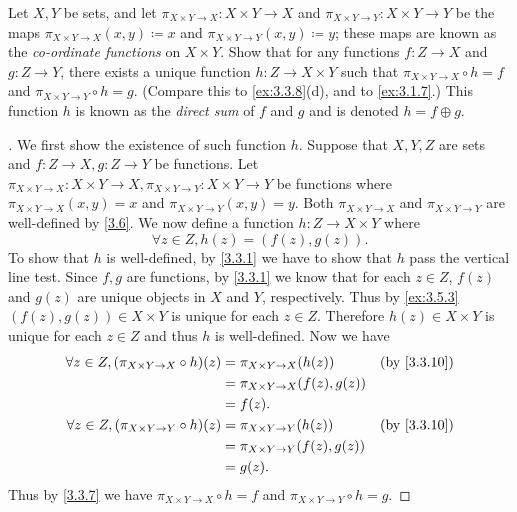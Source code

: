 \begin{ex}\label{ex:3.5.7}
	Let \(X, Y\) be sets, and let \(\pi_{X \times Y \to X} : X \times Y \to X\) and \(\pi_{X \times Y \to Y} : X \times Y \to Y\) be the maps \(\pi_{X \times Y \to X}(x, y) \coloneqq x\) and \(\pi_{X \times Y \to Y}(x, y) \coloneqq y\);
	these maps are known as the \emph{co-ordinate functions} on \(X \times Y\).
	Show that for any functions \(f : Z \to X\) and \(g : Z \to Y\), there exists a unique function \(h : Z \to X \times Y\) such that \(\pi_{X \times Y \to X} \circ h = f\) and \(\pi_{X \times Y \to Y} \circ h = g\).
	(Compare this to \cref{ex:3.3.8}(d), and to \cref{ex:3.1.7}.)
	This function \(h\) is known as the \emph{direct sum} of \(f\) and \(g\) and is denoted \(h = f \oplus g\).
\end{ex}

\begin{proof}[]
	We first show the existence of such function \(h\).
	Suppose that \(X, Y, Z\) are sets and \(f : Z \to X, g : Z \to Y\) be functions.
	Let \(\pi_{X \times Y \to X} : X \times Y \to X, \pi_{X \times Y \to Y} : X \times Y \to Y\) be functions where \(\pi_{X \times Y \to X}(x, y) = x\) and \(\pi_{X \times Y \to Y}(x, y) = y\).
	Both \(\pi_{X \times Y \to X}\) and \(\pi_{X \times Y \to Y}\) are well-defined by \cref{3.6}.
	We now define a function \(h : Z \to X \times Y\) where
	\[
		\forall z \in Z, h(z) = (f(z), g(z)).
	\]
	To show that \(h\) is well-defined, by \cref{3.3.1} we have to show that \(h\) pass the vertical line test.
	Since \(f, g\) are functions, by \cref{3.3.1} we know that for each \(z \in Z\), \(f(z)\) and \(g(z)\) are unique objects in \(X\) and \(Y\), respectively.
	Thus by \cref{ex:3.5.3} \((f(z), g(z)) \in X \times Y\) is unique for each \(z \in Z\).
	Therefore \(h(z) \in X \times Y\) is unique for each \(z \in Z\) and thus \(h\) is well-defined.
	Now we have
	\begin{align*}
		\forall z \in Z, (\pi_{X \times Y \to X} \circ h)(z) & = \pi_{X \times Y \to X}(h(z))       &  & \by{3.3.10} \\
		                                                     & = \pi_{X \times Y \to X}(f(z), g(z))                  \\
		                                                     & = f(z).                                               \\
		\forall z \in Z, (\pi_{X \times Y \to Y} \circ h)(z) & = \pi_{X \times Y \to Y}(h(z))       &  & \by{3.3.10} \\
		                                                     & = \pi_{X \times Y \to Y}(f(z), g(z))                  \\
		                                                     & = g(z).
	\end{align*}
	Thus by \cref{3.3.7} we have \(\pi_{X \times Y \to X} \circ h = f\) and \(\pi_{X \times Y \to Y} \circ h = g\).


\end{proof}
